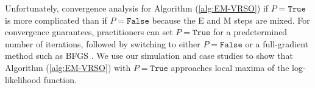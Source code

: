 Unfortunately, convergence analysis for Algorithm (\ref{alg:EM-VRSO}) if $P = \texttt{True}$ is more complicated than if $P = \texttt{False}$ because the E and M steps are mixed. For convergence guarantees, practitioners can set $P = \texttt{True}$ for a predetermined number of iterations, followed by switching to either $P = \texttt{False}$ or a full-gradient method such as BFGS \citep{Fletcher:2000}. We use our simulation and case studies to show that Algorithm (\ref{alg:EM-VRSO}) with $P = \texttt{True}$ approaches local maxima of the log-likelihood function.





